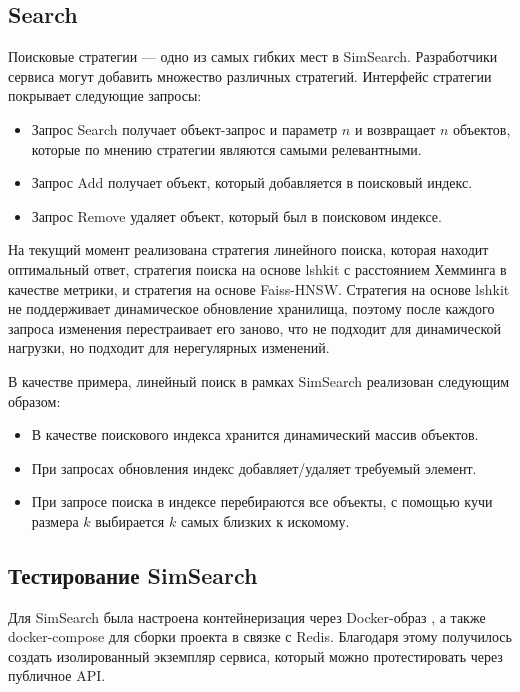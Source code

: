 \documentclass[a4paper,12pt]{extarticle}
\begin{document}
\newpage
\subsection{Search}

\label{STRAT}

Поисковые стратегии --- одно из самых гибких мест в SimSearch. Разработчики сервиса могут добавить множество различных стратегий. Интерфейс стратегии покрывает следующие запросы:

\begin{itemize}
\item Запрос Search получает объект-запрос и параметр $n$ и возвращает $n$ объектов, которые по мнению стратегии являются самыми релевантными.

\item Запрос Add получает объект, который добавляется в поисковый индекс.

\item Запрос Remove удаляет объект, который был в поисковом индексе.
\end{itemize}

На текущий момент реализована стратегия линейного поиска, которая находит оптимальный ответ, стратегия поиска на основе lshkit с расстоянием Хемминга в качестве метрики, и стратегия на основе Faiss-HNSW. Стратегия на основе lshkit не поддерживает динамическое обновление хранилища, поэтому после каждого запроса изменения перестраивает его заново, что не подходит для динамической нагрузки, но подходит для нерегулярных изменений. 

В качестве примера, линейный поиск в рамках SimSearch реализован следующим образом:

\begin{itemize}
\item В качестве поискового индекса хранится динамический массив объектов.
\item При запросах обновления индекс добавляет/удаляет требуемый элемент.
\item При запросе поиска в индексе перебираются все объекты, с помощью кучи \cite{enwiki:1088468512} размера $k$ выбирается $k$ самых близких к искомому.
\end{itemize}

\subsection{Тестирование SimSearch}

Для SimSearch была настроена контейнеризация через Docker-образ \cite{docker}, а также docker-compose \cite{dockercompose} для сборки проекта в связке с Redis. Благодаря этому получилось создать изолированный экземпляр сервиса, который можно протестировать через публичное API.
\end{document}
